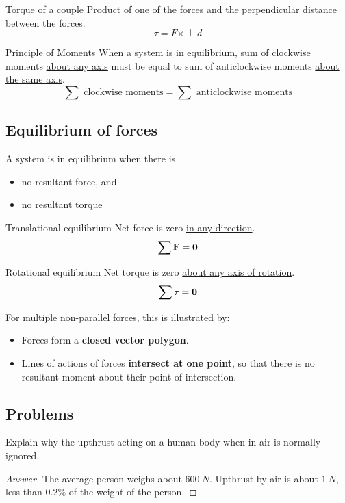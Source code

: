 \begin{defn}{Torque of a couple}{}
Product of one of the forces and the perpendicular distance between the forces.
\begin{equation} \tau = F \times \perp d \end{equation}
\end{defn}

\begin{defn}{Principle of Moments}{}
When a system is in equilibrium, sum of clockwise moments \underline{about any axis} must be equal to sum of anticlockwise moments \underline{about the same axis}.
\begin{equation} \sum \text{ clockwise moments} = \sum \text{ anticlockwise moments} \end{equation}
\end{defn} 
\pagebreak

\subsection{Equilibrium of forces}
A system is in equilibrium when there is 
\begin{itemize}
\item no resultant force, and
\item no resultant torque
\end{itemize}

\begin{defn}{Translational equilibrium}{}
Net force is zero \underline{in any direction}.
\[ \sum\vb{F}=\vb{0} \]
\end{defn} 

\begin{defn}{Rotational equilibrium}{}
Net torque is zero \underline{about any axis of rotation}. 
\[ \sum\mathbf{\tau}=\vb{0} \]
\end{defn}

For multiple non-parallel forces, this is illustrated by: 
\begin{itemize}
\item Forces form a \textbf{closed vector polygon}.
\item Lines of actions of forces \textbf{intersect at one point}, so that there is no resultant moment about their point of intersection.
\end{itemize}
\pagebreak

\subsection{Problems}
\begin{prbm}
Explain why the upthrust acting on a human body when in air is normally ignored.
\end{prbm}
\begin{proof}[Answer]
The average person weighs about $600\:\unit{N}$. Upthrust by air is about $1\:\unit{N}$, less than $0.2\%$ of the weight of the person.
\end{proof}

